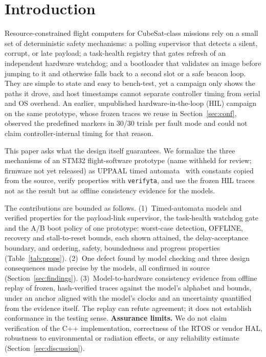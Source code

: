 \documentclass[conference,a4paper]{IEEEtran}
\begin{document}
\section{Introduction}
Resource-constrained flight computers for CubeSat-class missions rely on a small set of deterministic safety mechanisms: a polling supervisor that detects a silent, corrupt, or late payload; a task-health registry that gates refresh of an independent hardware watchdog; and a bootloader that validates an image before jumping to it and otherwise falls back to a second slot or a safe beacon loop. They are simple to state and easy to bench-test, yet a campaign only shows the paths it drove, and host timestamps cannot separate controller timing from serial and OS overhead. An earlier, unpublished hardware-in-the-loop (HIL) campaign on the same prototype, whose frozen traces we reuse in Section~\ref{sec:conf}, observed the predefined markers in 30/30 trials per fault mode and could not claim controller-internal timing for that reason.

This paper asks what the design itself guarantees. We formalize the three mechanisms of an STM32 flight-software prototype (name withheld for review; firmware not yet released) as UPPAAL timed automata~\cite{alur1994,larsen1997,behrmann2004} with constants copied from the source, verify properties with \texttt{verifyta}, and use the frozen HIL traces not as the result but as offline consistency evidence for the models.

The contributions are bounded as follows. (1)~Timed-automata models and verified properties for the payload-link supervisor, the task-health watchdog gate and the A/B boot policy of one prototype: worst-case detection, OFFLINE, recovery and stall-to-reset bounds, each shown attained, the delay-acceptance boundary, and ordering, safety, boundedness and progress properties (Table~\ref{tab:props}). (2)~One defect found by model checking and three design consequences made precise by the models, all confirmed in source (Section~\ref{sec:findings}). (3)~Model-to-hardware consistency evidence from offline replay of frozen, hash-verified traces against the model's alphabet and bounds, under an anchor aligned with the model's clocks and an uncertainty quantified from the evidence itself. The replay can refute agreement; it does not establish conformance in the testing sense.
\textbf{Assurance limits.} We do not claim verification of the C++ implementation, correctness of the RTOS or vendor HAL, robustness to environmental or radiation effects, or any reliability estimate (Section~\ref{sec:discussion}).
\end{document}

